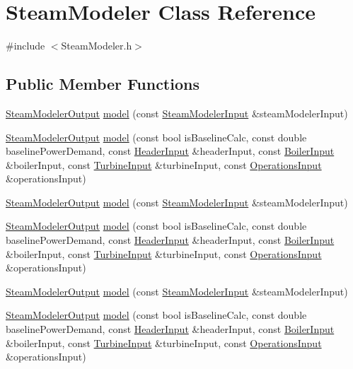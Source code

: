 \hypertarget{class_steam_modeler}{}\section{Steam\+Modeler Class Reference}
\label{class_steam_modeler}


{\ttfamily \#include $<$Steam\+Modeler.\+h$>$}

\subsection*{Public Member Functions}
\begin{DoxyCompactItemize}
\item 
\hyperlink{class_steam_modeler_output}{Steam\+Modeler\+Output} \hyperlink{class_steam_modeler_a2d0d297d49be3c9cf856253df508edcb}{model} (const \hyperlink{class_steam_modeler_input}{Steam\+Modeler\+Input} \&steam\+Modeler\+Input)
\item 
\hyperlink{class_steam_modeler_output}{Steam\+Modeler\+Output} \hyperlink{class_steam_modeler_a60b60a05d2527abf22140579b4b669bf}{model} (const bool is\+Baseline\+Calc, const double baseline\+Power\+Demand, const \hyperlink{class_header_input}{Header\+Input} \&header\+Input, const \hyperlink{class_boiler_input}{Boiler\+Input} \&boiler\+Input, const \hyperlink{class_turbine_input}{Turbine\+Input} \&turbine\+Input, const \hyperlink{class_operations_input}{Operations\+Input} \&operations\+Input)
\item 
\hyperlink{class_steam_modeler_output}{Steam\+Modeler\+Output} \hyperlink{class_steam_modeler_a2d0d297d49be3c9cf856253df508edcb}{model} (const \hyperlink{class_steam_modeler_input}{Steam\+Modeler\+Input} \&steam\+Modeler\+Input)
\item 
\hyperlink{class_steam_modeler_output}{Steam\+Modeler\+Output} \hyperlink{class_steam_modeler_a60b60a05d2527abf22140579b4b669bf}{model} (const bool is\+Baseline\+Calc, const double baseline\+Power\+Demand, const \hyperlink{class_header_input}{Header\+Input} \&header\+Input, const \hyperlink{class_boiler_input}{Boiler\+Input} \&boiler\+Input, const \hyperlink{class_turbine_input}{Turbine\+Input} \&turbine\+Input, const \hyperlink{class_operations_input}{Operations\+Input} \&operations\+Input)
\item 
\hyperlink{class_steam_modeler_output}{Steam\+Modeler\+Output} \hyperlink{class_steam_modeler_a2d0d297d49be3c9cf856253df508edcb}{model} (const \hyperlink{class_steam_modeler_input}{Steam\+Modeler\+Input} \&steam\+Modeler\+Input)
\item 
\hyperlink{class_steam_modeler_output}{Steam\+Modeler\+Output} \hyperlink{class_steam_modeler_a60b60a05d2527abf22140579b4b669bf}{model} (const bool is\+Baseline\+Calc, const double baseline\+Power\+Demand, const \hyperlink{class_header_input}{Header\+Input} \&header\+Input, const \hyperlink{class_boiler_input}{Boiler\+Input} \&boiler\+Input, const \hyperlink{class_turbine_input}{Turbine\+Input} \&turbine\+Input, const \hyperlink{class_operations_input}{Operations\+Input} \&operations\+Input)
\end{DoxyCompactItemize}


